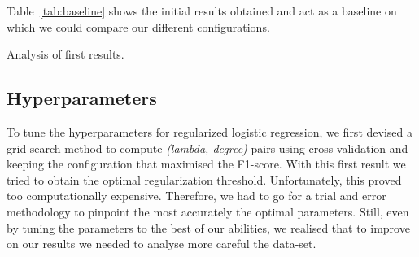 \documentclass[10pt,conference,compsocconf]{IEEEtran}
\begin{document}
\begin{table}[ht]
\centering
{}
\caption{Parameters and training results for the initial implementation.}
\label{tab:baseline}
\end{table}

Table~\ref{tab:baseline} shows the initial results obtained and act as a baseline 
on which we could compare our different configurations.

Analysis of first results.

\subsection{Hyperparameters}
To tune the hyperparameters for regularized logistic regression, 
we first devised a grid search method to compute \textit{(lambda, degree)} 
pairs using cross-validation and keeping the configuration 
that maximised the F1-score. With this first result we tried to obtain 
the optimal regularization threshold.
Unfortunately, this proved too computationally expensive. Therefore, 
we had to go for a trial and error methodology to pinpoint the most 
accurately the optimal parameters.
Still, even by tuning the parameters to the best of our abilities, 
we realised that to improve on our results we needed to analyse more 
careful the data-set.
\end{document}
